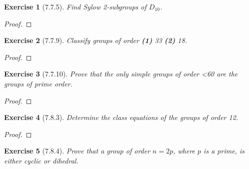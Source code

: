 \documentclass[12pt]{article}
\newtheorem*{exer}{Exercise}
\begin{document}

\begin{exer}[7.7.5]

    Find Sylow 2-subgroups of $D_{10}$.

\end{exer}

\begin{proof}

\end{proof}


\begin{exer}[7.7.9]

    Classify groups of order \textbf{(1)} 33 \textbf{(2)} 18.

\end{exer}

\begin{proof}

\end{proof}


\begin{exer}[7.7.10]

    Prove that the only simple groups of order <60 are the groups of
    prime order.

\end{exer}

\begin{proof}

\end{proof}


\begin{exer}[7.8.3]

    Determine the class equations of the groups of order 12.

\end{exer}

\begin{proof}

\end{proof}


\begin{exer}[7.8.4]

    Prove that a group of order $n = 2p$, where $p$ is a prime, is
    either cyclic or dihedral.

\end{exer}
\end{document}
